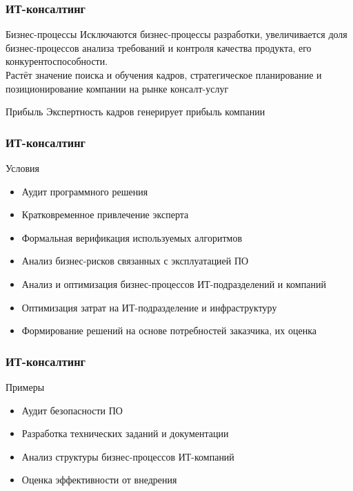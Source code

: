 \documentclass{../industrial-development}
\begin{document}
\begin{frame} \frametitle{ИТ-консалтинг}
	\begin{block}{Бизнес-процессы}
		Исключаются бизнес-процессы разработки, увеличивается доля бизнес-процессов анализа требований и контроля качества продукта, его конкурентоспособности.\\
		Растёт значение поиска и обучения кадров, стратегическое планирование и позиционирование компании на рынке консалт-услуг
	\end{block}
	\begin{block}{Прибыль}
		Экспертность кадров генерирует прибыль компании
	\end{block}
\end{frame}
\lecturenotes


\begin{frame} \frametitle{ИТ-консалтинг}
	\begin{block}{Условия}
		\begin{itemize}
			\item Аудит программного решения
			\item Кратковременное привлечение эксперта
			\item Формальная верификация используемых алгоритмов
			\item Анализ бизнес-рисков связанных с эксплуатацией ПО
			\item Анализ и оптимизация бизнес-процессов ИТ-подразделений и компаний
			\item Оптимизация затрат на ИТ-подразделение и инфраструктуру
			\item Формирование решений на основе потребностей заказчика, их оценка
		\end{itemize}
	\end{block}
\end{frame}
\lecturenotes


\begin{frame} \frametitle{ИТ-консалтинг}
	\begin{block}{Примеры}
		\begin{itemize}
			\item Аудит безопасности ПО
			\item Разработка технических заданий и документации
			\item Анализ структуры бизнес-процессов ИТ-компаний
			\item Оценка эффективности от внедрения
		\end{itemize}
	\end{block}
\end{frame}
\lecturenotes
\end{document}
